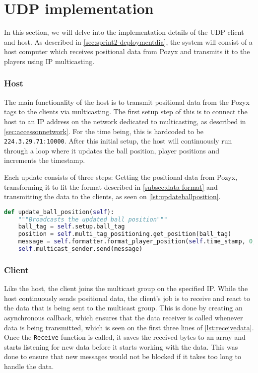 \section{UDP implementation}
In this section, we will delve into the implementation details of the UDP client and host.
As described in \autoref{sec:sprint2-deploymentdia}, the system will consist of a host computer which receives positional data from Pozyx and transmits it to the players using IP multicasting.

\subsubsection{Host}
The main functionality of the host is to transmit positional data from the Pozyx tags to the clients via multicasting.
The first setup step of this is to connect the host to an IP address on the network dedicated to multicasting, as described in \autoref{sec:accessonnetwork}.
For the time being, this is hardcoded to be \texttt{224.3.29.71:10000}.
After this initial setup, the host will continuously run through a loop where it updates the ball position, player positions and increments the timestamp.

Each update consists of three steps: Getting the positional data from Pozyx, transforming it to fit the format described in \autoref{subsec:data-format} and transmitting the data to the clients, as seen on \autoref{lst:updateballposition}.

\begin{lstlisting}[caption={Updating ball position},language=Python,label={lst:updateballposition}]
def update_ball_position(self):
    """Broadcasts the updated ball position"""
    ball_tag = self.setup.ball_tag
    position = self.multi_tag_positioning.get_position(ball_tag)
    message = self.formatter.format_player_position(self.time_stamp, 0, position.x, position.y)
    self.multicast_sender.send(message)
\end{lstlisting}

\subsubsection{Client}
Like the host, the client joins the multicast group on the specified IP.
While the host continuously sends positional data, the client's job is to receive and react to the data that is being sent to the multicast group.
This is done by creating an asynchronous callback, which ensures that the data receiver is called whenever data is being transmitted, which is seen on the first three lines of \autoref{lst:receivedata}.
Once the \texttt{Receive} function is called, it saves the received bytes to an array and starts listening for new data before it starts working with the data.
This was done to ensure that new messages would not be blocked if it takes too long to handle the data.

